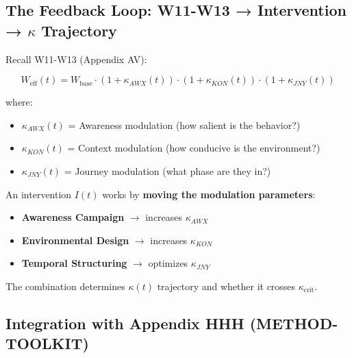 \documentclass[11pt, a4paper]{article}
\begin{document}
\subsection{The Feedback Loop: W11-W13 → Intervention → $\kappa$ Trajectory}

Recall W11-W13 (Appendix AV):

\begin{equation}
W_{\text{eff}}(t) = W_{\text{base}} \cdot (1 + \kappa_{AWX}(t)) \cdot (1 + \kappa_{KON}(t)) \cdot (1 + \kappa_{JNY}(t))
\end{equation}

\noindent
where:
\begin{itemize}
    \item $\kappa_{AWX}(t)$ = Awareness modulation (how salient is the behavior?)
    \item $\kappa_{KON}(t)$ = Context modulation (how conducive is the environment?)
    \item $\kappa_{JNY}(t)$ = Journey modulation (what phase are they in?)
\end{itemize}

\noindent
An intervention $I(t)$ works by \textbf{moving the modulation parameters}:

\begin{itemize}
    \item \textbf{Awareness Campaign} $\to$ increases $\kappa_{AWX}$
    \item \textbf{Environmental Design} $\to$ increases $\kappa_{KON}$
    \item \textbf{Temporal Structuring} $\to$ optimizes $\kappa_{JNY}$
\end{itemize}

\noindent
The combination determines $\kappa(t)$ trajectory and whether it crosses $\kappa_{\text{crit}}$.

\subsection{Integration with Appendix HHH (METHOD-TOOLKIT)}
\label{sec:bb-hhh-integration}
\end{document}
